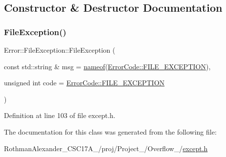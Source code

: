 \subsection{Constructor \& Destructor Documentation}
\hypertarget{class_error_1_1_file_exception_a9adb383bcc390b30299e87d6820a5a5b}{}\label{class_error_1_1_file_exception_a9adb383bcc390b30299e87d6820a5a5b} 
\subsubsection{\texorpdfstring{File\+Exception()}{FileException()}}
{\footnotesize\ttfamily Error\+::\+File\+Exception\+::\+File\+Exception (\begin{DoxyParamCaption}\item[{const std\+::string \&}]{msg = {\ttfamily \hyperlink{macros_8h_a235bdec0a6bf62f3b3af87e528109847}{nameof}(\hyperlink{namespace_error_1_1_error_code_ad646bbf666b6a07dc245d1e1b47107be}{Error\+Code\+::\+F\+I\+L\+E\+\_\+\+E\+X\+C\+E\+P\+T\+I\+ON})},  }\item[{unsigned int}]{code = {\ttfamily \hyperlink{namespace_error_1_1_error_code_ad646bbf666b6a07dc245d1e1b47107be}{Error\+Code\+::\+F\+I\+L\+E\+\_\+\+E\+X\+C\+E\+P\+T\+I\+ON}} }\end{DoxyParamCaption})\hspace{0.3cm}{\ttfamily [inline]}}



Definition at line 103 of file except.\+h.



The documentation for this class was generated from the following file\+:\begin{DoxyCompactItemize}
\item 
Rothman\+Alexander\+\_\+\+C\+S\+C17\+A\+\_/proj/\+Project\+\_/\+Overflow\+\_/\hyperlink{except_8h}{except.\+h}\end{DoxyCompactItemize}
